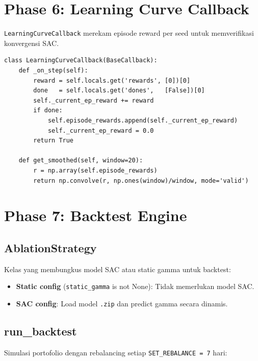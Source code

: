 \documentclass[12pt,a4paper]{article}
\begin{document}
\section{Phase 6: Learning Curve Callback}

\texttt{LearningCurveCallback} merekam episode reward per seed untuk memverifikasi konvergensi SAC.

\begin{lstlisting}[caption={LearningCurveCallback}]
class LearningCurveCallback(BaseCallback):
    def _on_step(self):
        reward = self.locals.get('rewards', [0])[0]
        done   = self.locals.get('dones',   [False])[0]
        self._current_ep_reward += reward
        if done:
            self.episode_rewards.append(self._current_ep_reward)
            self._current_ep_reward = 0.0
        return True

    def get_smoothed(self, window=20):
        r = np.array(self.episode_rewards)
        return np.convolve(r, np.ones(window)/window, mode='valid')
\end{lstlisting}

\section{Phase 7: Backtest Engine}

\subsection{AblationStrategy}

Kelas yang membungkus model SAC atau static gamma untuk backtest:

\begin{itemize}
  \item \textbf{Static config} (\texttt{static\_gamma} is not None): Tidak memerlukan model SAC.
  \item \textbf{SAC config}: Load model \texttt{.zip} dan predict gamma secara dinamis.
\end{itemize}

\subsection{run\_backtest}

Simulasi portofolio dengan rebalancing setiap \texttt{SET\_REBALANCE = 7} hari:
\end{document}
